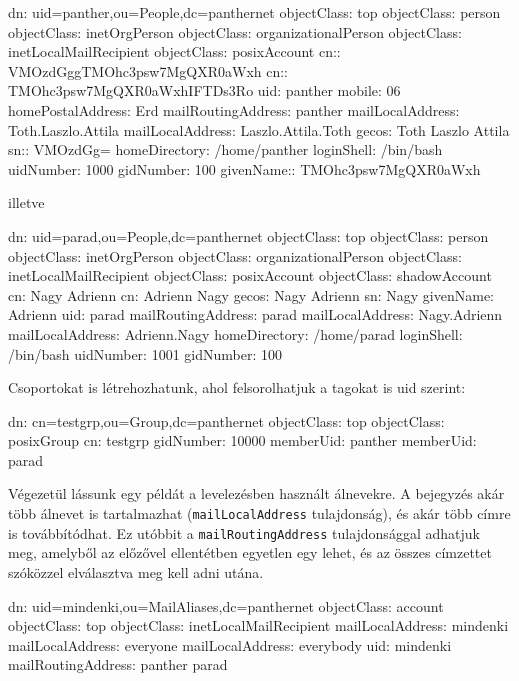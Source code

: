 \begin{VerbExample}
dn: uid=panther,ou=People,dc=panthernet
objectClass: top
objectClass: person
objectClass: inetOrgPerson
objectClass: organizationalPerson
objectClass: inetLocalMailRecipient
objectClass: posixAccount
cn:: VMOzdGggTMOhc3psw7MgQXR0aWxh
cn:: TMOhc3psw7MgQXR0aWxhIFTDs3Ro
uid: panther
mobile: 06
homePostalAddress: Erd
mailRoutingAddress: panther
mailLocalAddress: Toth.Laszlo.Attila
mailLocalAddress: Laszlo.Attila.Toth
gecos: Toth Laszlo Attila
sn:: VMOzdGg=
homeDirectory: /home/panther
loginShell: /bin/bash
uidNumber: 1000
gidNumber: 100
 givenName:: TMOhc3psw7MgQXR0aWxh
\end{VerbExample}

\noindent illetve

\begin{VerbExample}
dn: uid=parad,ou=People,dc=panthernet
objectClass: top
objectClass: person
objectClass: inetOrgPerson
objectClass: organizationalPerson
objectClass: inetLocalMailRecipient
objectClass: posixAccount
objectClass: shadowAccount
cn: Nagy Adrienn
cn: Adrienn Nagy
gecos: Nagy Adrienn
sn: Nagy
givenName: Adrienn
uid: parad
mailRoutingAddress: parad
mailLocalAddress: Nagy.Adrienn
mailLocalAddress: Adrienn.Nagy
homeDirectory: /home/parad
loginShell: /bin/bash
uidNumber: 1001
gidNumber: 100
\end{VerbExample}

\noindent Csoportokat is létrehozhatunk, ahol felsorolhatjuk a tagokat is uid szerint:

\begin{VerbExample}
dn: cn=testgrp,ou=Group,dc=panthernet
objectClass: top
objectClass: posixGroup
cn: testgrp
gidNumber: 10000
memberUid: panther
memberUid: parad
\end{VerbExample}


Végezetül lássunk egy példát a levelezésben használt álnevekre. A bejegyzés akár több álnevet is tartalmazhat
(\texttt{mailLocalAddress} tulajdonság), és akár több címre is továbbítódhat. Ez utóbbit a \texttt{mailRoutingAddress}
tulajdonsággal adhatjuk meg, amelyből az előzővel ellentétben egyetlen egy lehet, és az összes címzettet szóközzel
elválasztva meg kell adni utána.

\begin{VerbExample}
dn: uid=mindenki,ou=MailAliases,dc=panthernet
objectClass: account
objectClass: top
objectClass: inetLocalMailRecipient
mailLocalAddress: mindenki
mailLocalAddress: everyone
mailLocalAddress: everybody
uid: mindenki
mailRoutingAddress: panther parad
\end{VerbExample}


